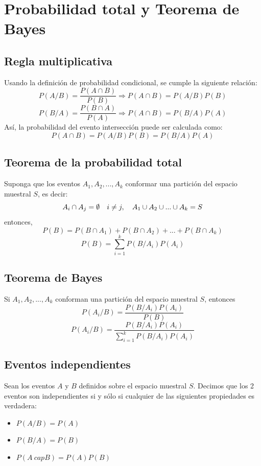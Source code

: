 \documentclass[12pt,twocolumn,a4paper]{report}
\begin{document}
\chapter*{Probabilidad total y Teorema de Bayes}

\section*{Regla multiplicativa}
Usando la definición de probabilidad condicional, se cumple la siguiente relación: 
$$
P(A/B) = \frac{P(A\cap B)}{P(B)} \Rightarrow P(A\cap B) = P(A/B)P(B)
$$
$$
P(B/A) = \frac{P(B\cap A)}{P(A)} \Rightarrow P(A\cap B) = P(B/A)P(A)
$$
Así, la probabilidad del evento intersección puede ser calculada como:
$$
P(A\cap B) = P(A/B)P(B) = P(B/A)P(A)
$$

\section*{Teorema de la probabilidad total}
Suponga que los eventos $A_1, A_2, ..., A_k$ conformar una partición del espacio muestral $S$, es decir: 
$$
A_i \cap A_j = \emptyset \hspace{10px} i \neq j, \hspace{10px} A_1 \cup A_2 \cup ... \cup A_k = S
$$
entonces,
$$
P(B) = P(B\cap A_1) + P(B\cap A_2) + ... + P(B \cap A_k)
$$
$$
P(B) = \sum_{i=1}^{k}P(B/A_i)P(A_i)
$$

\section*{Teorema de Bayes}
Si $A_1, A_2, ..., A_k$ conforman una partición del espacio muestral $S$, entonces 
$$
P(A_i/B) = \frac{P(B/A_i)P(A_i)}{P(B)}
$$
$$
P(A_i/B) = \frac{P(B/A_i)P(A_i)}{\sum_{i=1}^{k}P(B/A_i)P(A_i)}
$$

\section*{Eventos independientes}
Sean los eventos $A$ y $B$ definidos sobre el espacio muestral $S$. Decimos que los 2 eventos son independientes si y sólo si cualquier de las siguientes propiedades es verdadera:
\begin{itemize}
\setlength\itemsep{0.001cm}
\item{$P(A/B) = P(A)$}
\item{$P(B/A) = P(B)$}
\item{$P(A\ cap B) = P(A)P(B)$}
\end{itemize}
\end{document}
